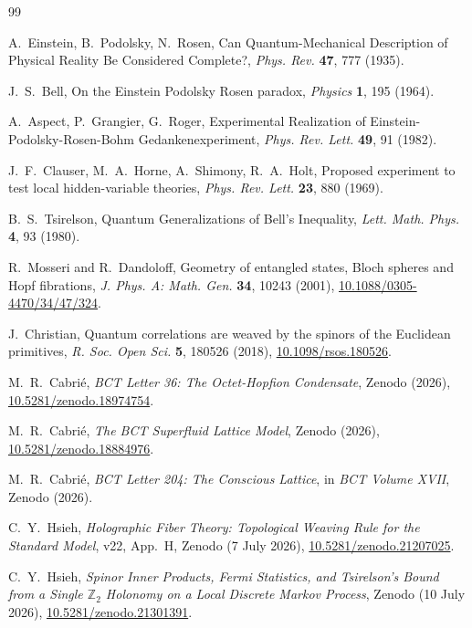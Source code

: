 \documentclass[aps,prl,twocolumn,showpacs,preprintnumbers]{revtex4-2}
\begin{document}
\begin{thebibliography}{99}

A.~Einstein, B.~Podolsky, N.~Rosen,
Can Quantum-Mechanical Description of Physical Reality
Be Considered Complete?,
\textit{Phys. Rev.} \textbf{47}, 777 (1935).

J.~S.\ Bell,
On the Einstein Podolsky Rosen paradox,
\textit{Physics} \textbf{1}, 195 (1964).

A.~Aspect, P.~Grangier, G.~Roger,
Experimental Realization of Einstein-Podolsky-Rosen-Bohm
Gedankenexperiment,
\textit{Phys. Rev. Lett.} \textbf{49}, 91 (1982).

J.~F.\ Clauser, M.~A.\ Horne, A.~Shimony, R.~A.\ Holt,
Proposed experiment to test local hidden-variable theories,
\textit{Phys. Rev. Lett.} \textbf{23}, 880 (1969).

B.~S.\ Tsirelson,
Quantum Generalizations of Bell's Inequality,
\textit{Lett. Math. Phys.} \textbf{4}, 93 (1980).

R.~Mosseri and R.~Dandoloff,
Geometry of entangled states, Bloch spheres and Hopf
fibrations,
\textit{J. Phys. A: Math. Gen.} \textbf{34}, 10243 (2001),
\href{https://doi.org/10.1088/0305-4470/34/47/324}{10.1088/0305-4470/34/47/324}.

J.~Christian,
Quantum correlations are weaved by the spinors of the
Euclidean primitives,
\textit{R. Soc. Open Sci.} \textbf{5}, 180526 (2018),
\href{https://doi.org/10.1098/rsos.180526}{10.1098/rsos.180526}.

M.~R.\ Cabri\'e,
\textit{BCT Letter 36: The Octet-Hopfion Condensate},
Zenodo (2026),
\href{https://doi.org/10.5281/zenodo.18974754}{10.5281/zenodo.18974754}.

M.~R.\ Cabri\'e,
\textit{The BCT Superfluid Lattice Model},
Zenodo (2026),
\href{https://doi.org/10.5281/zenodo.18884976}{10.5281/zenodo.18884976}.

M.~R.\ Cabri\'e,
\textit{BCT Letter 204: The Conscious Lattice},
in \textit{BCT Volume XVII}, Zenodo (2026).

C.~Y.\ Hsieh,
\textit{Holographic Fiber Theory: Topological Weaving Rule
for the Standard Model}, v22, App.~H,
Zenodo (7 July 2026),
\href{https://doi.org/10.5281/zenodo.21207025}{10.5281/zenodo.21207025}.

C.~Y.\ Hsieh,
\textit{Spinor Inner Products, Fermi Statistics, and
Tsirelson's Bound from a Single $\mathbb{Z}_2$ Holonomy on
a Local Discrete Markov Process},
Zenodo (10 July 2026),
\href{https://doi.org/10.5281/zenodo.21301391}{10.5281/zenodo.21301391}.

\end{thebibliography}
\end{document}
